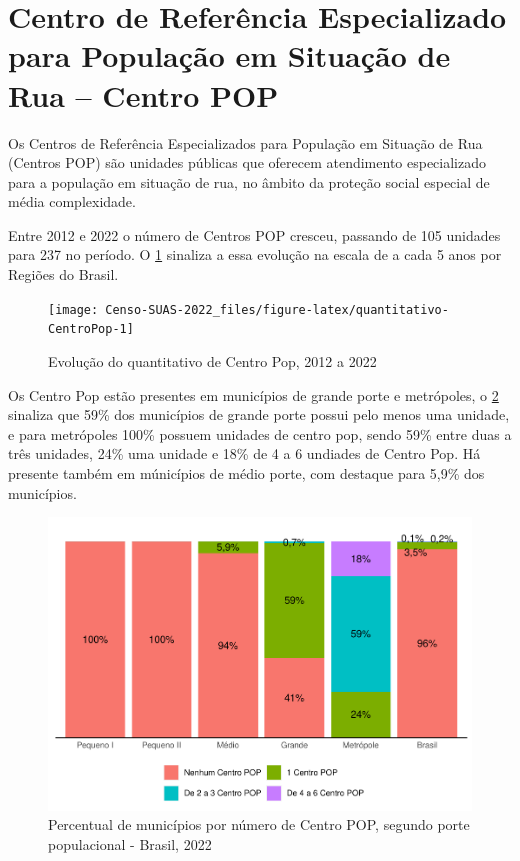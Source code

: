 \documentclass[
  brazilian]{report}
\begin{document}
\hypertarget{centro-de-referuxeancia-especializado-para-populauxe7uxe3o-em-situauxe7uxe3o-de-rua-centro-pop}{%
\section{Centro de Referência Especializado para População em Situação
de Rua -- Centro
POP}\label{centro-de-referuxeancia-especializado-para-populauxe7uxe3o-em-situauxe7uxe3o-de-rua-centro-pop}}

Os Centros de Referência Especializados para População em Situação de
Rua (Centros POP) são unidades públicas que oferecem atendimento
especializado para a população em situação de rua, no âmbito da proteção
social especial de média complexidade.

Entre 2012 e 2022 o número de Centros POP cresceu, passando de 105
unidades para 237 no período. O \cref{fig:quantitativo-CentroPop}
sinaliza a essa evolução na escala de a cada 5 anos por Regiões do
Brasil.

\begin{figure}
\texttt{[image: Censo-SUAS-2022\_files/figure-latex/quantitativo-CentroPop-1]} \caption[Evolução do quantitativo de Centro Pop, 2012 a 2022]{Evolução do quantitativo de Centro Pop, 2012 a 2022}\label{fig:quantitativo-CentroPop}
\end{figure}

Os Centro Pop estão presentes em municípios de grande porte e
metrópoles, o \cref{fig:cpop-porte} sinaliza que 59\% dos municípios de
grande porte possui pelo menos uma unidade, e para metrópoles 100\%
possuem unidades de centro pop, sendo 59\% entre duas a três unidades,
24\% uma unidade e 18\% de 4 a 6 undiades de Centro Pop. Há presente
também em múnicípios de médio porte, com destaque para 5,9\% dos
municípios.

\begin{figure}
\includegraphics{Censo-SUAS-2022_files/figure-latex/cpop-porte-1} \caption[Percentual de municípios por número de Centro POP, segundo porte populacional - Brasil, 2022]{Percentual de municípios por número de Centro POP, segundo porte populacional - Brasil, 2022}\label{fig:cpop-porte}
\end{figure}
\end{document}
